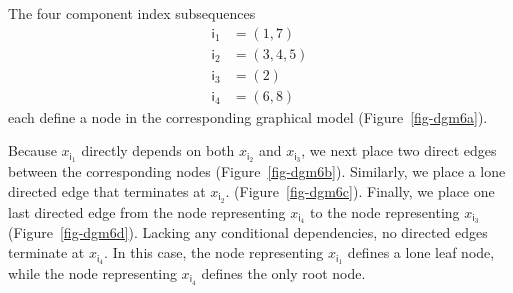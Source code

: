 \documentclass[
  letterpaper,
  DIV=11,
  numbers=noendperiod]{scrartcl}
\begin{document}
The four component index subsequences \begin{align*}
\mathsf{i}_{1} &= ( 1, 7 )
\\
\mathsf{i}_{2} &= ( 3, 4, 5 )
\\
\mathsf{i}_{3} &= ( 2 )
\\
\mathsf{i}_{4} &= ( 6, 8 )
\end{align*} each define a node in the corresponding graphical model
(Figure~\ref{fig-dgm6a}).

Because \(x_{ \mathsf{i}_{1} }\) directly depends on both
\(x_{ \mathsf{i}_{2} }\) and \(x_{ \mathsf{i}_{3} }\), we next place two
direct edges between the corresponding nodes (Figure~\ref{fig-dgm6b}).
Similarly, we place a lone directed edge that terminates at
\(x_{ \mathsf{i}_{2} }\). (Figure~\ref{fig-dgm6c}). Finally, we place
one last directed edge from the node representing
\(x_{ \mathsf{i}_{4} }\) to the node representing
\(x_{ \mathsf{i}_{3} }\) (Figure~\ref{fig-dgm6d}). Lacking any
conditional dependencies, no directed edges terminate at
\(x_{ \mathsf{i}_{4} }\). In this case, the node representing
\(x_{ \mathsf{i}_{1} }\) defines a lone leaf node, while the node
representing \(x_{ \mathsf{i}_{4} }\) defines the only root node.
\end{document}
